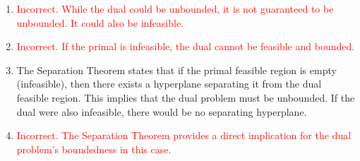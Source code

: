 \documentclass{article}%
\newcommand{\incorrect}[1]{\textcolor{red}{#1}}
\begin{document}
\begin{enumerate}
\begin{enumerate}
\item \incorrect{Incorrect. While the dual could be unbounded, it is not guaranteed to be unbounded. It could also be infeasible.}%
\item \incorrect{Incorrect.  If the primal is infeasible, the dual cannot be feasible and bounded.}%
\item The Separation Theorem states that if the primal feasible region is empty (infeasible), then there exists a hyperplane separating it from the dual feasible region. This implies that the dual problem must be unbounded.  If the dual were also infeasible, there would be no separating hyperplane.%
\item \incorrect{Incorrect. The Separation Theorem provides a direct implication for the dual problem's boundedness in this case.}%
\end{enumerate}%
\vspace{1em}%
\end{enumerate}

%
\end{document}
